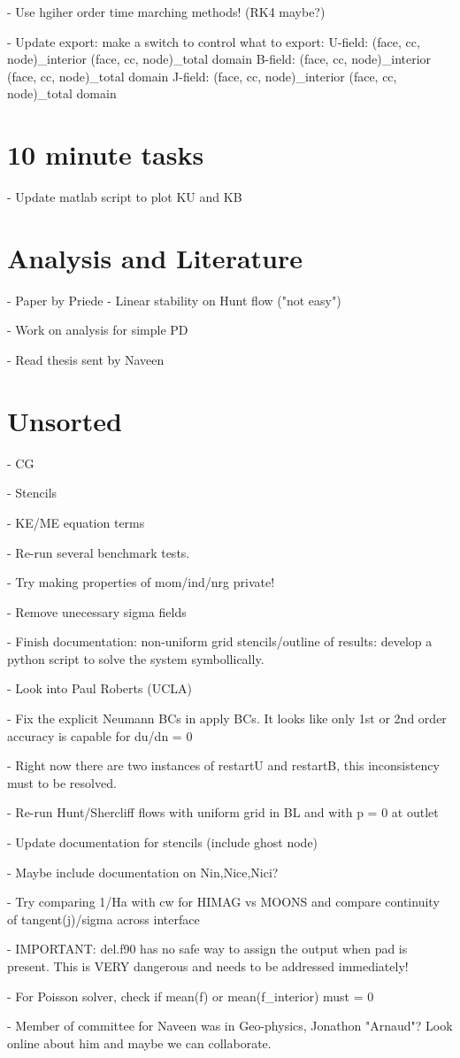\documentclass[11pt]{article}
\begin{document}
- Use hgiher order time marching methods! (RK4 maybe?)

- Update export: make a switch to control what to export:
      U-field: (face, cc, node)\_interior (face, cc, node)\_total domain
      B-field: (face, cc, node)\_interior (face, cc, node)\_total domain
      J-field: (face, cc, node)\_interior (face, cc, node)\_total domain

\section{10 minute tasks}
- Update matlab script to plot KU and KB


\section{Analysis and Literature}
- Paper by Priede - Linear stability on Hunt flow ("not easy")

- Work on analysis for simple PD

- Read thesis sent by Naveen

\section{Unsorted}

- CG

- Stencils

- KE/ME equation terms

- Re-run several benchmark tests.

- Try making properties of mom/ind/nrg private!

- Remove unecessary sigma fields

- Finish documentation: non-uniform grid stencils/outline of results: develop a python script to solve the system symbollically.

- Look into Paul Roberts (UCLA)

- Fix the explicit Neumann BCs in apply BCs. It looks like only 1st or 2nd order accuracy is capable for du/dn = 0

- Right now there are two instances of restartU and restartB, this inconsistency must to be resolved.

- Re-run Hunt/Shercliff flows with uniform grid in BL and with p = 0 at outlet

- Update documentation for stencils (include ghost node)

- Maybe include documentation on Nin,Nice,Nici?

- Try comparing 1/Ha with cw for HIMAG vs MOONS and compare continuity of tangent(j)/sigma across interface

- IMPORTANT: del.f90 has no safe way to assign the output when pad is present. This is VERY dangerous and needs to be addressed immediately!

- For Poisson solver, check if mean(f) or mean(f\_interior) must = 0

- Member of committee for Naveen was in Geo-physics, Jonathon "Arnaud"? Look online about him and maybe we can collaborate.
\end{document}
